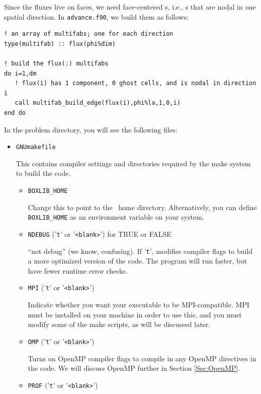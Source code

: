 Since the fluxes live on faces, we need face-centered \MultiFab s, i.e.,
\MultiFab s that are nodal in one spatial direction.  In {\tt advance.f90},
we build them as follows:
\begin{lstlisting}[backgroundcolor=\color{light-green}]
! an array of multifabs; one for each direction
type(multifab) :: flux(phi%dim) 

! build the flux(:) multifabs
do i=1,dm
   ! flux(i) has 1 component, 0 ghost cells, and is nodal in direction i
   call multifab_build_edge(flux(i),phi%la,1,0,i)
end do
\end{lstlisting}

In the problem directory, you will see the following files:
\begin{itemize}
\item {\tt GNUmakefile}

This contains compiler settings and directories required by the make system to build the code.

  \begin{itemize}

    \item {\tt BOXLIB\_HOME}

    Change this to point to the \BoxLib\ home directory.  Alternatively, you can define {\tt BOXLIB\_HOME}
    as an environment variable on your system.

    \item {\tt NDEBUG} ('{\tt t}' or '{\tt <blank>}') for TRUE or FALSE
      
    ``not debug'' (we know, confusing).  If '{\tt t}', modifies compiler flags to build a 
    more optimized version of the code.  The program will run faster, but have fewer 
    runtime error checks.

    \item {\tt MPI} ('{\tt t}' or '{\tt <blank>}')

    Indicate whether you want your executable to be MPI-compatible.  MPI must be installed on your
    machine in order to use this, and you must modify some of the make scripts, as will be 
    discussed later.

    \item {\tt OMP} ('{\tt t}' or '{\tt <blank>}')

    Turns on OpenMP compiler flags to compile in any OpenMP directives in the code.
    We will discuss OpenMP further in Section \ref{Sec:OpenMP}.

    \item {\tt PROF} ('{\tt t}' or '{\tt <blank>}')


\end{itemize}
\end{itemize}
